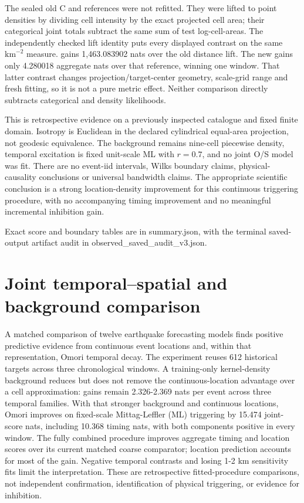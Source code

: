 The sealed old C  and  references were not refitted. They were lifted to point densities by dividing cell intensity by the exact projected cell area; their categorical joint totals subtract the same sum of test log-cell-areas. The independently checked lift identity puts every displayed contrast on the same \(\mathrm{km}^{-2}\) measure.  gains 1,463.083902 nats over the old distance lift. The new  gains only 4.280018 aggregate nats over that reference, winning one window. That latter contrast changes projection/target-center geometry, scale-grid range and fresh fitting, so it is not a pure metric effect. Neither comparison directly subtracts categorical and density likelihoods.

This is retrospective evidence on a previously inspected catalogue and fixed finite domain. Isotropy is Euclidean in the declared cylindrical equal-area projection, not geodesic equivalence. The background remains nine-cell piecewise density, temporal excitation is fixed unit-scale ML with $r=0.7$, and no joint O/S model was fit. There are no event-iid intervals, Wilks boundary claims, physical-causality conclusions or universal bandwidth claims. The appropriate scientific conclusion is a strong location-density improvement for this continuous triggering procedure, with no accompanying timing improvement and no meaningful incremental inhibition gain.

Exact score and boundary tables are in summary.json, with the terminal saved-output artifact audit in observed\_\allowbreak{}saved\_\allowbreak{}audit\_\allowbreak{}v3.json.

\section{Joint temporal--spatial and background comparison}

A matched comparison of twelve earthquake forecasting models finds positive predictive evidence from continuous event locations and, within that representation, Omori temporal decay. The experiment reuses 612 historical targets across three chronological windows. A training-only kernel-density background reduces but does not remove the continuous-location advantage over a cell approximation: gains remain 2.326-2.369 nats per event across three temporal families. With that stronger background and continuous locations, Omori improves on fixed-scale Mittag-Leffler (ML) triggering by 15.474 joint-score nats, including 10.368 timing nats, with both components positive in every window. The fully combined procedure improves aggregate timing and location scores over its current matched coarse comparator; location prediction accounts for most of the gain. Negative temporal contrasts and losing 1-2 km sensitivity fits limit the interpretation. These are retrospective fitted-procedure comparisons, not independent confirmation, identification of physical triggering, or evidence for inhibition.


